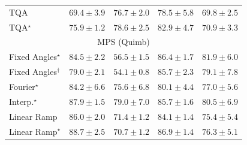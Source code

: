 \begin{tabular}{l|cccc|}
TQA & {\cellcolor[HTML]{99B2D5}} \color[HTML]{000000} $69.4\pm 3.9$ & {\cellcolor[HTML]{8C72B5}} \color[HTML]{F1F1F1} $76.7\pm 2.0$ & {\cellcolor[HTML]{8B62AD}} \color[HTML]{F1F1F1} $78.5\pm 5.8$ & {\cellcolor[HTML]{98AED3}} \color[HTML]{000000} $69.8\pm 2.5$ \\
TQA$^\star$ & {\cellcolor[HTML]{8C7AB8}} \color[HTML]{F1F1F1} $75.9\pm 1.2$ & {\cellcolor[HTML]{8B61AC}} \color[HTML]{F1F1F1} $78.6\pm 2.5$ & {\cellcolor[HTML]{873A98}} \color[HTML]{F1F1F1} $82.9\pm 4.7$ & {\cellcolor[HTML]{94A6CE}} \color[HTML]{F1F1F1} $70.9\pm 3.3$ \\
\cline{1-5}
\multicolumn{5}{c}{\rule{0pt}{8pt}MPS (Quimb)} \\
\midrule
Fixed Angles$^\star$ & {\cellcolor[HTML]{B34003}} \color[HTML]{F1F1F1} $84.5\pm 2.2$ & {\cellcolor[HTML]{FFFBD0}} \color[HTML]{000000} $56.5\pm 1.5$ & {\cellcolor[HTML]{9E3604}} \color[HTML]{F1F1F1} $86.4\pm 1.7$ & {\cellcolor[HTML]{CE4F03}} \color[HTML]{F1F1F1} $81.9\pm 6.0$ \\
Fixed Angles$^\dagger$ & {\cellcolor[HTML]{E2650F}} \color[HTML]{F1F1F1} $79.0\pm 2.1$ & {\cellcolor[HTML]{FFFFE5}} \color[HTML]{000000} $54.1\pm 0.8$ & {\cellcolor[HTML]{A63A03}} \color[HTML]{F1F1F1} $85.7\pm 2.3$ & {\cellcolor[HTML]{E1640E}} \color[HTML]{F1F1F1} $79.1\pm 7.8$ \\
Fourier$^\star$ & {\cellcolor[HTML]{B64203}} \color[HTML]{F1F1F1} $84.2\pm 6.6$ & {\cellcolor[HTML]{F4811D}} \color[HTML]{F1F1F1} $75.6\pm 6.8$ & {\cellcolor[HTML]{DA5C0A}} \color[HTML]{F1F1F1} $80.1\pm 4.4$ & {\cellcolor[HTML]{EE7416}} \color[HTML]{F1F1F1} $77.0\pm 5.6$ \\
Interp.$^\star$ & {\cellcolor[HTML]{8E3104}} \color[HTML]{F1F1F1} $87.9\pm 1.5$ & {\cellcolor[HTML]{E2650F}} \color[HTML]{F1F1F1} $79.0\pm 7.0$ & {\cellcolor[HTML]{A63A03}} \color[HTML]{F1F1F1} $85.7\pm 1.6$ & {\cellcolor[HTML]{D75908}} \color[HTML]{F1F1F1} $80.5\pm 6.9$ \\
Linear Ramp & {\cellcolor[HTML]{A33904}} \color[HTML]{F1F1F1} $86.0\pm 2.0$ & {\cellcolor[HTML]{FEA634}} \color[HTML]{000000} $71.4\pm 1.2$ & {\cellcolor[HTML]{B84203}} \color[HTML]{F1F1F1} $84.1\pm 1.4$ & {\cellcolor[HTML]{F4821D}} \color[HTML]{F1F1F1} $75.4\pm 5.4$ \\
Linear Ramp$^\star$ & {\cellcolor[HTML]{842E05}} \color[HTML]{F1F1F1} $88.7\pm 2.5$ & {\cellcolor[HTML]{FEAD3A}} \color[HTML]{000000} $70.7\pm 1.2$ & {\cellcolor[HTML]{993404}} \color[HTML]{F1F1F1} $86.9\pm 1.4$ & {\cellcolor[HTML]{F17B1A}} \color[HTML]{F1F1F1} $76.3\pm 5.1$ \\

\end{tabular}
